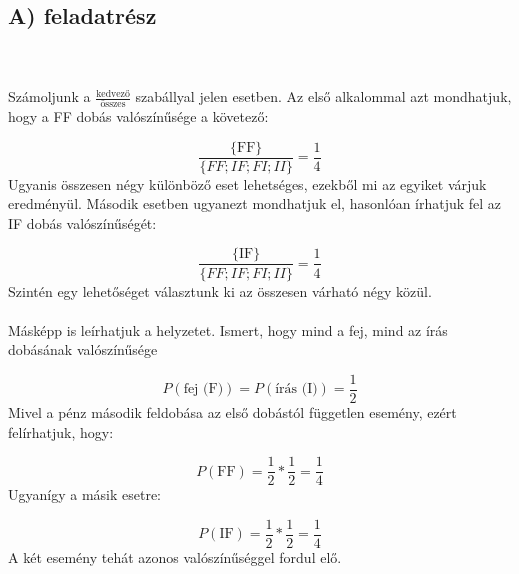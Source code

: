 \section{} \label{sec:2}
\subsection*{A) feladatrész}
\\ \\
Számoljunk a $\frac{\text{kedvező}}{\text{összes}}$ szabállyal jelen esetben. Az első alkalommal azt mondhatjuk, hogy a FF dobás valószínűsége a követező:

\begin{equation} \label{eq:1}
    \frac{\text{\{FF\}}}{\{FF; IF; FI; II\}} = \frac{1}{4}
\end{equation}
Ugyanis összesen négy különböző eset lehetséges, ezekből mi az egyiket várjuk eredményül. Második esetben ugyanezt mondhatjuk el, hasonlóan írhatjuk fel az IF dobás valószínűségét:

\begin{equation} \label{eq:2}
    \frac{\text{\{IF\}}}{\{FF; IF; FI; II\}} = \frac{1}{4}
\end{equation}
Szintén egy lehetőséget választunk ki az összesen várható négy közül.
\\ \\
Másképp is leírhatjuk a helyzetet. Ismert, hogy mind a fej, mind az írás dobásának valószínűsége

\begin{equation} \label{eq:3}
    P \left( \text{fej (F)} \right) = P \left( \text{írás (I)} \right) = \frac{1}{2}
\end{equation}
Mivel a pénz második feldobása az első dobástól független esemény, ezért felírhatjuk, hogy:

\begin{equation} \label{eq:4}
    P \left( \text{FF} \right) = \frac{1}{2} * \frac{1}{2} = \frac{1}{4}
\end{equation}
Ugyanígy a másik esetre:

\begin{equation} \label{eq:5}
    P \left( \text{IF} \right) = \frac{1}{2} * \frac{1}{2} = \frac{1}{4}
\end{equation}
A két esemény tehát azonos valószínűséggel fordul elő.

